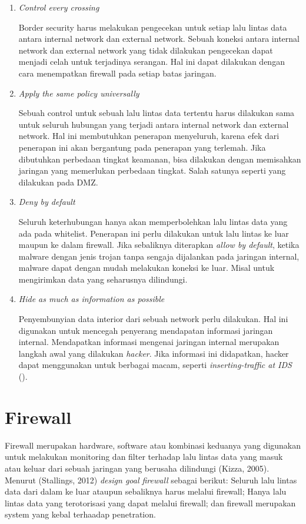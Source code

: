 \begin{enumerate}
	\item \textit{Control every crossing}
	
	Border security harus melakukan pengecekan untuk setiap lalu lintas data antara internal network dan external network. Sebuah koneksi antara internal network dan external network yang tidak dilakukan pengecekan
	dapat menjadi celah untuk terjadinya serangan. Hal ini dapat dilakukan dengan cara menempatkan firewall pada setiap batas jaringan.
	
	\item \textit{Apply the same policy universally}
	
	Sebuah control untuk sebuah lalu lintas data tertentu harus dilakukan sama untuk seluruh hubungan yang terjadi antara internal network dan external network. Hal ini membutuhkan penerapan menyeluruh, karena efek dari penerapan ini akan bergantung pada penerapan yang terlemah. Jika dibutuhkan perbedaan tingkat keamanan, bisa dilakukan dengan memisahkan jaringan yang memerlukan perbedaan tingkat. Salah satunya seperti yang dilakukan pada DMZ.
	
	\item \textit{Deny by default}
	
	Seluruh keterhubungan hanya akan memperbolehkan lalu lintas data yang ada pada whitelist. Penerapan ini perlu dilakukan untuk lalu lintas ke luar	maupun ke dalam firewall. Jika sebaliknya diterapkan \textit{allow by default}, ketika malware dengan jenis trojan tanpa sengaja dijalankan pada jaringan internal, malware dapat dengan mudah melakukan koneksi ke luar. Misal untuk mengirimkan data yang seharusnya dilindungi.
	
	\item \textit{Hide as much as information as possible}
	
	Penyembunyian data interior dari sebuah network perlu dilakukan. Hal ini digunakan untuk mencegah penyerang mendapatan informasi jaringan internal. Mendapatkan informasi mengenai jaringan internal merupakan langkah awal yang dilakukan \textit{hacker}. Jika informasi ini didapatkan, hacker dapat menggunakan untuk berbagai macam, seperti \textit{inserting-traffic at IDS} (\cite{marpaung2012survey}).
	
\end{enumerate}

\section{Firewall}
Firewall merupakan hardware, software atau kombinasi keduanya yang digunakan untuk melakukan monitoring dan filter terhadap lalu lintas data yang masuk atau keluar dari sebuah jaringan yang berusaha dilindungi (Kizza, 2005). Menurut (Stallings, 2012) \textit{design goal firewall} sebagai berikut: 
Seluruh lalu lintas data dari dalam ke luar ataupun sebaliknya harus melalui firewall;
Hanya lalu lintas data yang terotorisasi yang dapat melalui firewall;
dan firewall merupakan system yang kebal terhaadap penetration.

